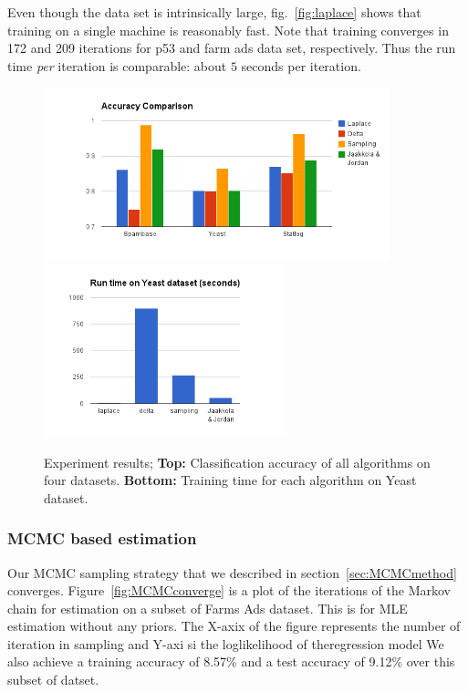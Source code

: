 Even though the data set is intrinsically large, fig.~\ref{fig:laplace} shows
that training on a single machine is reasonably fast. Note that training
converges in 172 and 209 iterations for p53 and farm ads data set,
respectively. Thus the run time {\em per} iteration is comparable: about $5$
seconds per iteration.


\begin{figure}[t]
\label{fig:laplace}
\centering
\includegraphics[height=5.0cm]{results/accuracy_comp.png}
\includegraphics[height=5.0cm]{results/speed_comp.png}

\caption{\small Experiment results; {\bf Top:} Classification accuracy of all algorithms on
four datasets. {\bf Bottom:} Training time for each algorithm on Yeast dataset. }

\label{graphlab}
\end{figure}

\subsubsection{MCMC based estimation}
Our MCMC sampling strategy that we described in section~\ref{sec:MCMCmethod}
converges. Figure~\ref{fig:MCMCconverge} is a plot of the iterations of the Markov 
chain for estimation on a subset of Farms Ads dataset. This is for MLE
estimation without any priors. The X-axix of the figure represents the number of
iteration in sampling and Y-axi si the loglikelihood of theregression model We
also achieve a training accuracy of 8.57\% and a test accuracy of 9.12\% over 
this subset of datset. 

